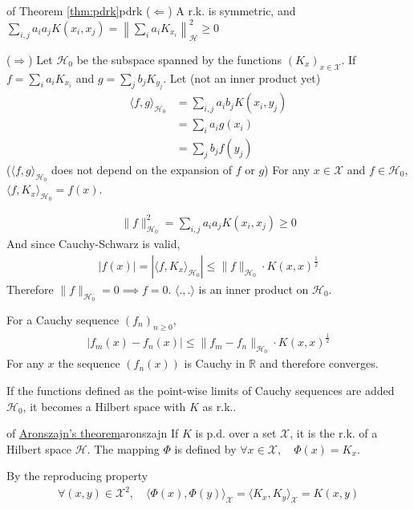 \documentclass{article}
\begin{document}
\begin{Proof}{of Theorem \ref{thm:pdrk}}{pdrk}
  ($\Leftarrow$) A r.k. is symmetric, and $\sum_{i,j} a_i a_j K(x_i, x_j)
   = \left\lVert \sum_i a_i K_{x_i} \right\rVert^2_\mathcal{H} \geq 0$

  \vspace{10pt}
  ($\Rightarrow$) Let $\mathcal{H}_0$ be the subspace spanned by the functions 
  $(K_x)_{x\in \mathcal{X}}$. If $f = \sum_i a_i K_{x_i}$ and $g =
  \sum_j b_j K_{y_j}$. Let (not an inner product yet)
  \begin{align*}
    \langle f, g\rangle_{\mathcal{H}_0} &= \sum_{i,j}a_i b_j K(x_i, y_j)\\
    &= \sum_i a_i g(x_i)\\
    &= \sum_j b_j f(y_j)
  \end{align*}
  ($\langle f,g \rangle_{\mathcal{H}_0}$ does not depend on the expansion of $f$
  or $g$) For any $x\in \mathcal{X}$ and $f \in \mathcal{H}_0$, $\langle f,K_x 
  \rangle_{\mathcal{H}_0} = f(x)$.

  \begin{align*}
    \lVert f \rVert^2_{\mathcal{H}_0} = \sum_{i,j} a_i a_j K(x_i, x_j) \geq 0
  \end{align*}
  And since Cauchy-Schwarz is valid, 
  \begin{align*}
    |f(x)| = |\langle f, K_x \rangle_{\mathcal{H}_0}| \leq \lVert f 
    \rVert_{\mathcal{H}_0}\cdot K(x,x)^{\frac{1}{2}}
  \end{align*}
  Therefore $\lVert f \rVert_{\mathcal{H}_0} = 0 \implies f = 0$. $\langle ., .
  \rangle$ is an inner product on $\mathcal{H}_0$. 

  For a Cauchy sequence $(f_n)_{n\geq 0}$, 
  \begin{align*}
    |f_m(x) - f_n(x)| \leq \lVert f_m - f_n \rVert_{\mathcal{H}_0} \cdot
    K(x, x)^{\frac{1}{2}}
  \end{align*}
  For any $x$ the sequence $(f_n(x))$ is Cauchy in $\mathbb{R}$ and therefore
  converges. 

  If the functions defined as the point-wise limits of Cauchy sequences are
  added $\mathcal{H}_0$, it becomes a Hilbert space with $K$ as r.k..
\end{Proof}

\begin{Proof}{of \hyperref[thm:aronszajn]{Aronszajn's theorem}}{aronszajn}
  If $K$ is p.d. over a set $\mathcal{X}$, it is the r.k. of a Hilbert space 
  $\mathcal{H}$. The mapping $\Phi$ is defined by $\forall x \in \mathcal{X}, 
  \quad \Phi(x) = K_x$.

  By the reproducing property 
  \begin{align*}
    \forall (x,y)\in \mathcal{X}^2,\quad \langle \Phi(x), \Phi(y) 
    \rangle_\mathcal{X} = \langle K_x, K_y \rangle_\mathcal{X} = K(x, y)
  \end{align*}
\end{Proof}
\end{document}
